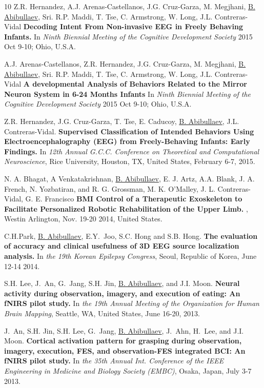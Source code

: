 \documentclass[10pt,letterpaper,sans]{moderncv}   %
\begin{document}
\begin{thebibliography}{10}
Z.R. Hernandez, A.J. Arenas-Castellanos, J.G. Cruz-Garza, M. Megjhani, \underline{B. Abibullaev}, Sri. R.P. Maddi, T. Tse,  C. Armstrong, W. Long, J.L. Contreras-Vidal
\newblock \textbf{Decoding Intent From Non-invasive {EEG} in Freely Behaving Infants.}
\newblock In {\em Ninth Biennial Meeting of the Cognitive Development Society} 2015 Oct 9-10; Ohio, U.S.A.

A.J. Arenas-Castellanos, Z.R. Hernandez, J.G. Cruz-Garza, M. Megjhani, \underline{B. Abibullaev}, Sri. R.P. Maddi, T. Tse,  C. Armstrong, W. Long, J.L. Contreras-Vidal
\newblock \textbf{A developmental Analysis of Behaviors Related to the Mirror Neuron System in 6-24 Months Infants}
\newblock In {\em Ninth Biennial Meeting of the Cognitive Development Society} 2015 Oct 9-10; Ohio, U.S.A.

Z.R. Hernandez, J.G. Cruz-Garza, T. Tse, E. Caducoy, \underline{B. Abibullaev}, J.L. Contreras-Vidal.
\newblock \textbf{Supervised Classification of Intended Behaviors Using Electroencephalography ({EEG}) from Freely-Behaving Infants: Early Findings.}
\newblock In {\em 12th Annual G.C.C. Conference on Theoretical and Computational Neuroscience}, Rice University, Houston, TX, United States, February 6-7, 2015.

N. A. Bhagat, A Venkatakrishnan, \underline{B. Abibullaev}, E. J. Artz, A.A. Blank, J. A. French, N. Yozbatiran, and R. G. Grossman, M. K. O'Malley, J. L. Contreras-Vidal, G. E. Francisco
\newblock \textbf{{BMI} Control of a Therapeutic Exoskeleton to Facilitate Personalized Robotic Rehabilitation of the Upper Limb.} 
, Westin Arlington, Nov. 19-20 2014, United States.  

C.H.Park,  \underline{B. Abibullaev}, E.Y.~Joo, S.C. Hong and S.B. Hong.
\newblock \textbf{The evaluation of accuracy and clinical usefulness of 3D {EEG} source localization analysis.}
\newblock In {\em the 19th Korean Epilepsy Congress}, Seoul, Republic of Korea, June 12-14 2014.

S.H. Lee, J.~An, G.~Jang, S.H. Jin, \underline{B. Abibullaev}, and J.I. Moon.
\newblock \textbf{Neural activity during observation, imagery, and execution of eating: An {fNIRS} pilot study.}
\newblock In {\em the 19th Annual Meeting of the Organization for Human Brain
  Mapping}, Seattle, WA, United States, June 16-20, 2013.

J.~An, S.H. Jin, S.H. Lee, G.~Jang, \underline{B. Abibullaev}, J.~Ahn, H.~Lee, and J.I. Moon.
\newblock \textbf{Cortical activation pattern for grasping during observation, imagery, execution, {FES}, and observation-{FES} integrated {BCI}: An {fNIRS} pilot study.}
\newblock In {\em the 35th Annual Int. Conference of the {IEEE} Engineering in Medicine and Biology Society (EMBC)}, Osaka, Japan, July 3-7 2013.


\end{thebibliography}
\end{document}
